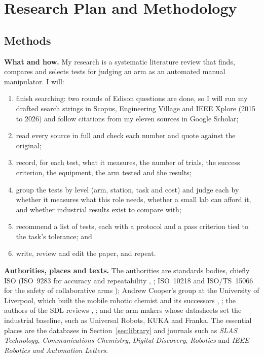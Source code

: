 \section{Research Plan and Methodology}

\subsection{Methods}\label{sec:methods}

\textbf{What and how.} My research is a systematic literature review that finds, compares and
selects tests for judging an arm as an automated manual manipulator. I will:
\begin{enumerate}[1.]
  \item finish searching: two rounds of Edison questions are done, so I will run my drafted
    search strings in Scopus, Engineering Village and IEEE Xplore (2015 to 2026) and follow
    citations from my eleven sources in Google Scholar;
  \item read every source in full and check each number and quote against the original;
  \item record, for each test, what it measures, the number of trials, the success criterion,
    the equipment, the arm tested and the results;
  \item group the tests by level (arm, station, task and cost) and judge each by whether it
    measures what this role needs, whether a small lab can afford it, and whether industrial
    results exist to compare with;
  \item recommend a list of tests, each with a protocol and a pass criterion tied to the task's
    tolerance; and
  \item write, review and edit the paper, and repeat.
\end{enumerate}

\textbf{Authorities, places and texts.} The authorities are standards bodies, chiefly ISO
(ISO~9283 for accuracy and repeatability \cite{harazono2024}, \cite{chajon2026}; ISO~10218 and
ISO/TS~15066 for the safety of collaborative arms \cite{ferraguti2019}); Andrew Cooper's group
at the University of Liverpool, which built the mobile robotic chemist and its successors
\cite{burger2020}, \cite{zhou2025}; the authors of the SDL reviews \cite{tom2024}, \cite{doloi2025}; and the arm
makers whose datasheets set the industrial baseline, such as Universal Robots, KUKA and Franka.
The essential places are the databases in Section~\ref{sec:library} and journals such as
\emph{SLAS Technology}, \emph{Communications Chemistry}, \emph{Digital Discovery},
\emph{Robotics} and \emph{IEEE Robotics and Automation Letters}.

